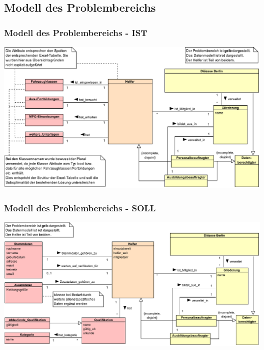 \documentclass{beamer}
\begin{document}
\subsection{Modell des Problembereichs}		
\begin{frame}
\frametitle{Modell des Problembereichs - IST}
\includegraphics[width=\textwidth]{PDF/Klassendiagramm_ist.pdf}
\end{frame}
\begin{frame}
\frametitle{Modell des Problembereichs - SOLL}
\includegraphics[width=\textwidth]{PDF/Klassendiagramm_soll.pdf}
\end{frame}
\end{document}
